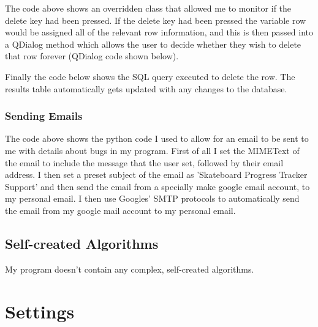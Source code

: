 The code above shows an overridden class that allowed me to monitor if the delete key had been pressed. If the delete key had been pressed the variable row would be assigned all of the relevant row information, and this is then passed into a QDialog method which allows the user to decide whether they wish to delete that row forever (QDialog code shown below).


Finally the code below shows the SQL query executed to delete the row. The results table automatically gets updated with any changes to the database.





\subsubsection{Sending Emails}


The code above shows the python code I used to allow for an email to be sent to me with details about bugs in my program. First of all I set the MIMEText of the email to include the message that the user set, followed by their email address. I then set a preset subject of the email as 'Skateboard Progress Tracker Support' and then send the email from a specially make google email account, to my personal email. I then use Googles' SMTP protocols to automatically send the email from my google mail account to my personal email.


\subsection{Self-created Algorithms}

My program doesn't contain any complex, self-created algorithms.













\section{Settings}


